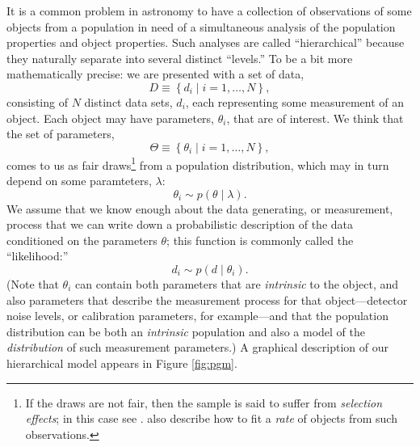 \documentclass[modern]{aastex63}
\begin{document}
It is a common problem in astronomy to have a collection of observations of some
objects from a population in need of a simultaneous analysis of the population
properties and object properties.  Such analyses are called ``hierarchical''
because they naturally separate into several distinct ``levels.''  To be a bit
more mathematically precise: we are presented with a set of data,
%
\begin{equation}
  D \equiv \left\{ d_i \mid i = 1, \ldots, N \right\},
\end{equation}
%
consisting of $N$ distinct data sets, $d_i$, each representing some measurement
of an object.  Each object may have parameters, $\theta_i$, that are of
interest.  We think that the set of parameters,
%
\begin{equation}
  \Theta \equiv \left\{ \theta_i \mid i = 1, \ldots, N \right\},
\end{equation}
%
comes to us as fair draws\footnote{If the draws are not fair, then the sample is
said to suffer from \emph{selection effects}; in this case see
\citet{Loredo2004,Messenger2013,Mandel2019}.  \citet{Loredo2004,Mandel2019} also
describe how to fit a \emph{rate} of objects from such observations.} from a
population distribution, which may in turn depend on some paramteters,
$\lambda$:
%
\begin{equation}
  \theta_i \sim p\left( \theta \mid \lambda \right).
\end{equation}
%
We assume that we know enough about the data generating, or measurement, process
that we can write down a probabilistic description of the data conditioned on
the parameters $\theta$; this function is commonly called the ``likelihood:''
%
\begin{equation}
  d_i \sim p\left( d \mid \theta_i \right).
\end{equation}
%
(Note that $\theta_i$ can contain both parameters that are \emph{intrinsic} to
the object, and also parameters that describe the measurement process for that
object---detector noise levels, or calibration parameters, for example---and
that the population distribution can be both an \emph{intrinsic} population and
also a model of the \emph{distribution} of such measurement parameters.)  A
graphical description of our hierarchical model appears in Figure \ref{fig:pgm}.
\end{document}
